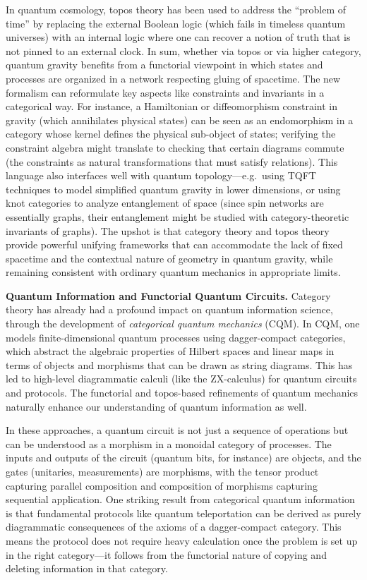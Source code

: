 \documentclass[12pt]{article}
\begin{document}
In quantum cosmology, topos theory has been used to address the ``problem of time'' by replacing the external Boolean logic (which fails in timeless quantum universes) with an internal logic where one can recover a notion of truth that is not pinned to an external clock. In sum, whether via topos or via higher category, quantum gravity benefits from a functorial viewpoint in which states and processes are organized in a network respecting gluing of spacetime. The new formalism can reformulate key aspects like constraints and invariants in a categorical way. For instance, a Hamiltonian or diffeomorphism constraint in gravity (which annihilates physical states) can be seen as an endomorphism in a category whose kernel defines the physical sub-object of states; verifying the constraint algebra might translate to checking that certain diagrams commute (the constraints as natural transformations that must satisfy relations). This language also interfaces well with quantum topology---e.g.\ using TQFT techniques to model simplified quantum gravity in lower dimensions, or using knot categories to analyze entanglement of space (since spin networks are essentially graphs, their entanglement might be studied with category-theoretic invariants of graphs). The upshot is that category theory and topos theory provide powerful unifying frameworks that can accommodate the lack of fixed spacetime and the contextual nature of geometry in quantum gravity, while remaining consistent with ordinary quantum mechanics in appropriate limits.

\medskip
\textbf{Quantum Information and Functorial Quantum Circuits.} Category theory has already had a profound impact on quantum information science, through the development of \emph{categorical quantum mechanics} (CQM). In CQM, one models finite-dimensional quantum processes using dagger-compact categories, which abstract the algebraic properties of Hilbert spaces and linear maps in terms of objects and morphisms that can be drawn as string diagrams. This has led to high-level diagrammatic calculi (like the ZX-calculus) for quantum circuits and protocols. The functorial and topos-based refinements of quantum mechanics naturally enhance our understanding of quantum information as well. 

In these approaches, a quantum circuit is not just a sequence of operations but can be understood as a morphism in a monoidal category of processes. The inputs and outputs of the circuit (quantum bits, for instance) are objects, and the gates (unitaries, measurements) are morphisms, with the tensor product capturing parallel composition and composition of morphisms capturing sequential application. One striking result from categorical quantum information is that fundamental protocols like quantum teleportation can be derived as purely diagrammatic consequences of the axioms of a dagger-compact category. This means the protocol does not require heavy calculation once the problem is set up in the right category---it follows from the functorial nature of copying and deleting information in that category.
\end{document}
